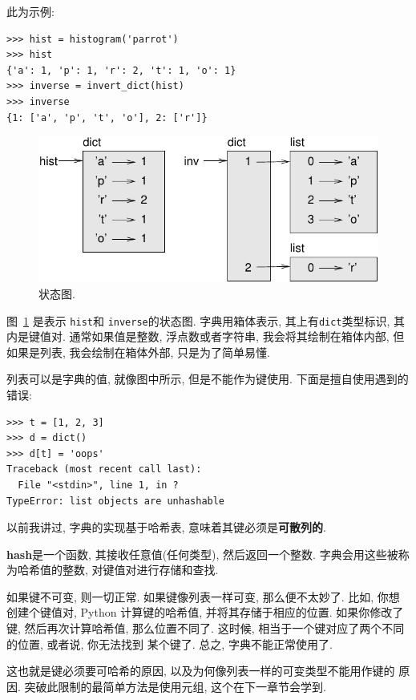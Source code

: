 \documentclass[10pt]{book}
\begin{document}
此为示例:

\begin{verbatim}
>>> hist = histogram('parrot')
>>> hist
{'a': 1, 'p': 1, 'r': 2, 't': 1, 'o': 1}
>>> inverse = invert_dict(hist)
>>> inverse
{1: ['a', 'p', 't', 'o'], 2: ['r']}
\end{verbatim}

\begin{figure}
\centerline
{\includegraphics[scale=0.8]{figs/dict1.pdf}}
\caption{状态图.}
\label{fig.dict1}
\end{figure}

图~\ref{fig.dict1} 是表示 {\tt hist}和 {\tt inverse}的状态图. 
字典用箱体表示, 其上有{\tt dict}类型标识, 其内是键值对. 
通常如果值是整数, 浮点数或者字符串, 我会将其绘制在箱体内部, 
但如果是列表, 我会绘制在箱体外部, 只是为了简单易懂. 

列表可以是字典的值, 就像图中所示, 但是不能作为键使用. 
下面是擅自使用遇到的错误:


\begin{verbatim}
>>> t = [1, 2, 3]
>>> d = dict()
>>> d[t] = 'oops'
Traceback (most recent call last):
  File "<stdin>", line 1, in ?
TypeError: list objects are unhashable
\end{verbatim}
%
以前我讲过, 字典的实现基于哈希表, 意味着其键必须是{\bf 可散列的}.

{\bf hash}是一个函数, 其接收任意值(任何类型), 然后返回一个整数. 
字典会用这些被称为哈希值的整数, 对键值对进行存储和查找. 

如果键不可变, 则一切正常. 
如果键像列表一样可变, 那么便不太妙了. 
比如, 你想创建个键值对, 
Python 计算键的哈希值, 并将其存储于相应的位置. 
如果你修改了键, 然后再次计算哈希值, 那么位置不同了. 
这时候, 相当于一个键对应了两个不同的位置, 或者说, 你无法找到
某个键了. 总之, 字典不能正常使用了. 

这也就是键必须要可哈希的原因, 以及为何像列表一样的可变类型不能用作键的
原因. 突破此限制的最简单方法是使用元组, 这个在下一章节会学到. 
\end{document}
